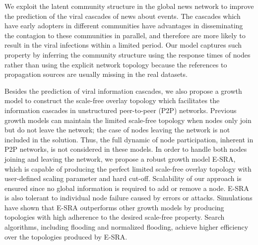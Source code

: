 We exploit the latent community structure in the global news network to improve the prediction of the viral cascades of news about events. The cascades which have early adopters in different communities have advantages in disseminating the contagion to these communities in parallel, and therefore are more likely to result in the viral infections within a limited period. Our model captures such property by inferring the community structure using the response times of nodes rather than using the explicit network topology because the references to propagation sources are usually missing in the real datasets.

Besides the prediction of viral information cascades, we also propose a growth model to construct the scale-free overlay topology which facilitates the information cascades in unstructured peer-to-peer (P2P) networks. Previous growth models can maintain the limited scale-free topology when nodes only join but do not leave the network; the case of nodes leaving the network is not included in the solution. Thus, the full dynamic of node participation, inherent in P2P networks, is not considered in these models. In order to handle both nodes joining and leaving the network, we propose a robust growth model E-SRA, which is capable of producing the perfect limited scale-free overlay topology with user-defined scaling parameter and hard cut-off. Scalability of our approach is ensured since no global information is required to add or remove a node. E-SRA is also tolerant to individual node failure caused by errors or attacks. Simulations have shown that E-SRA outperforms other growth models by producing topologies with high adherence to the desired scale-free property. Search algorithms, including flooding and normalized flooding, achieve higher efficiency over the topologies produced by E-SRA.